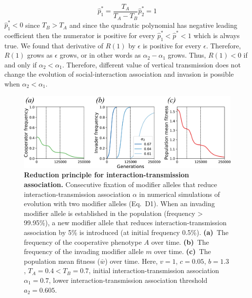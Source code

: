 \documentclass[12pt]{extarticle}
\begin{document}
\begin{equation} \label{eq:numerator_roots}
  \hat{p}^*_1 = \frac{T_A}{T_A-T_B} \hat{p}^*_2 = 1
\end{equation}
$\hat{p}^*_1 < 0$ since $T_B>T_A$ and since the quadratic polynomial has negative leading coefficient then the numerator is positive for every $\hat{p}^*_1<\hat{p}^*<1$ which is always true.
We found that derivative of $R(1)$ by $\epsilon$ is positive for every $\epsilon$. 
Therefore, $R(1)$ grows as $\epsilon$ grows, or in other words as $\alpha_2-\alpha_1$ grows.
Thus, $R(1)<0$ if and only if $\alpha_2<\alpha_1$. Therefore, different value of vertical transmission does not change the evolution of social-interaction association and invasion is possible when $\alpha_2<\alpha_1$.

\begin{figure}[h]
  \centering
  \includegraphics[width=1\textwidth]{../PRSB_figures/fig_s1.pdf}
  \caption{
  \textbf{Reduction principle for interaction-transmission association.} 
  Consecutive fixation of modifier alleles that reduce interaction-transmission association $\alpha$ in numerical simulations of evolution with two modifier alleles (Eq.~D1).
  When an invading modifier allele is established in the population (frequency > 99.95\%), a new modifier allele that reduces interaction-transmission association by 5\% is introduced (at initial frequency 0.5\%).
  \textbf{(a)}~The frequency of the cooperative phenotype $A$ over time.
  \textbf{(b)}~The frequency of the invading modifier allele $m$ over time. 
  \textbf{(c)}~The population mean fitness ($\bar{w}$) over time.
  Here, $v=1$, $c = 0.05$, $b=1.3$, $T_A=0.4<T_B=0.7$, initial interaction-transmission association $\alpha_1=0.7$, lower interaction-transmission association threshold $a_2=0.605$.  
  }
  \label{fig:invasion}
\end{figure}
\newpage
\end{document}
